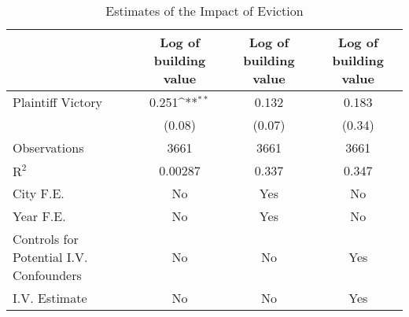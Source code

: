 \begin{table}[htbp]\centering
\def\sym#1{\ifmmode^{#1}\else\(^{#1}\)\fi}
\caption{Estimates of the Impact of Eviction}
\begin{tabular}{l*{3}{c}}
\toprule
                    &\multicolumn{1}{c}{Log of building value}&\multicolumn{1}{c}{Log of building value}&\multicolumn{1}{c}{Log of building value}\\
\midrule
Plaintiff Victory   &       0.251\sym{**} &       0.132         &       0.183         \\
                    &      (0.08)         &      (0.07)         &      (0.34)         \\
\midrule
Observations        &        3661         &        3661         &        3661         \\
$\text{R}^2$        &     0.00287         &       0.337         &       0.347         \\
City F.E.           &          No         &         Yes         &          No         \\
Year F.E.           &          No         &         Yes         &          No         \\
Controls for Potential I.V. Confounders&          No         &          No         &         Yes         \\
I.V. Estimate       &          No         &          No         &         Yes         \\
\bottomrule
\end{tabular}
\end{table}
